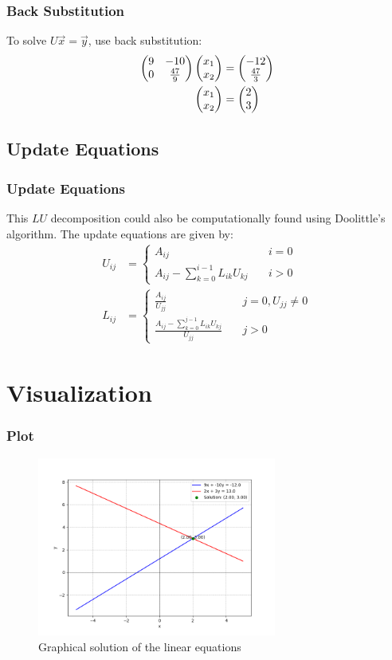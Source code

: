\documentclass{beamer}
\begin{document}
\begin{frame}
\frametitle{Back Substitution}
To solve $U\vec{x} = \vec{y}$, use back substitution:
\begin{align}
    \begin{pmatrix}9 & -10\\ 0 & \frac{47}{9}\end{pmatrix}\begin{pmatrix}x_1 \\ x_2\end{pmatrix} &= \begin{pmatrix}-12 \\ \frac{47}{3}\end{pmatrix}\\
    \begin{pmatrix}x_1 \\ x_2\end{pmatrix} &= \begin{pmatrix}2 \\ 3\end{pmatrix}
\end{align}
\end{frame}

\subsection{Update Equations}
\begin{frame}
\frametitle{Update Equations}
This $LU$ decomposition could also be computationally found using Doolittle's algorithm. The update equations are given by:
\begin{align}
    U_{ij} &= \begin{cases}
        A_{ij} & \quad i = 0\\
        A_{ij} - \sum_{k = 0}^{i - 1} L_{ik} U_{kj} & \quad i > 0
    \end{cases}\\
    L_{ij} &= \begin{cases}
        \frac{A_{ij}}{U_{jj}} & \quad j = 0, U_{jj} \neq 0\\
        \frac{A_{ij} - \sum_{k = 0}^{j - 1} L_{ik} U_{kj}}{U_{jj}} & \quad j > 0
    \end{cases}
\end{align}
\end{frame}

\section{Visualization}
\begin{frame}
\frametitle{Plot}
\begin{figure}[H]
    \centering
    \includegraphics[width=0.7\textwidth]{figs/plot.png}
    \caption{Graphical solution of the linear equations}
\end{figure}
\end{frame}
\end{document}
